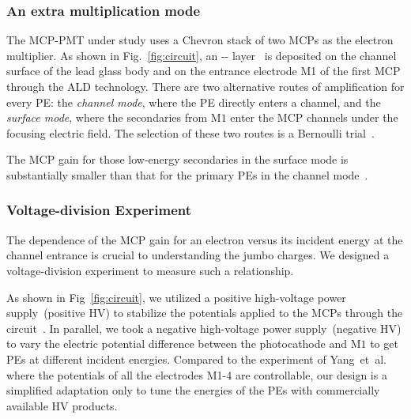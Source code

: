 \subsubsection{An extra multiplication mode}
The MCP-PMT under study uses a Chevron stack of two MCPs as the electron multiplier.
As shown in Fig.~\ref{fig:circuit}, an -- layer~\cite{zzj2021Al} is deposited
on the channel surface of the lead glass body
and on the entrance electrode M1 of the first MCP through the ALD technology.
There are two alternative routes of amplification for every PE:
the \textit{channel mode}, where the PE directly enters a channel,
and the \textit{surface mode}, where the secondaries from $\mathrm{M}1$ enter the MCP channels under the focusing electric field.
The selection of these two routes is a Bernoulli trial~\cite{1955Scintillation}.

The MCP gain for those low-energy secondaries in the surface mode is substantially
smaller than that for the primary PEs in the channel mode~\cite{2012An}.

\subsubsection{Voltage-division Experiment}\label{sec:gain}
The dependence of the MCP gain for an electron versus its incident energy at the
channel entrance is crucial to understanding the jumbo charges.
We designed a voltage-division experiment to measure such a relationship.

As shown in Fig~\ref{fig:circuit}, we utilized a positive high-voltage power supply~(positive HV) to stabilize the potentials applied
to the MCPs through the circuit~\cite{Luo:2023jdf}.  In parallel, we took a negative high-voltage power supply~(negative HV) to vary the electric
potential difference between the photocathode and $\mathrm{M}1$ to get PEs at different incident energies.
Compared to the experiment of Yang~et~al.~\cite{2017MCP} where the potentials of all the electrodes M1-4
are controllable, our design is a simplified adaptation only to tune the energies of the PEs with commercially available HV products.

